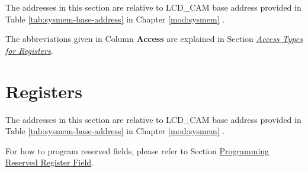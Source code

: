 \documentclass[main\_\_EN.tex]{subfiles}
\begin{document}
The addresses in this section are relative to LCD\_CAM base address provided in Table \ref{tab:sysmem-base-address} in Chapter \ref{mod:sysmem} \textit{}.

The abbreviations given in Column \textbf{Access} are explained in Section \hyperref[glossary-access-types]{\textit{Access Types for Registers}}.






\newpage
\section{Registers}

The addresses in this section are relative to LCD\_CAM base address provided in Table \ref{tab:sysmem-base-address} in Chapter \ref{mod:sysmem} \textit{}.

For how to program reserved fields, please refer to Section \hyperref[programming-reserved-field]{Programming Reserved Register Field}.


\end{document}
